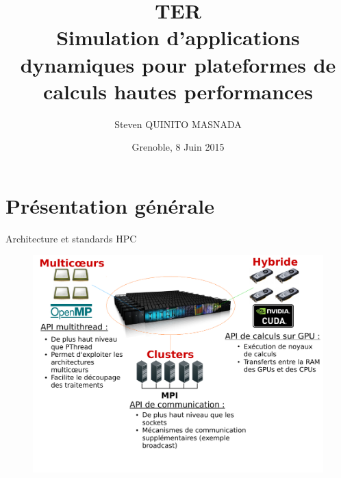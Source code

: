 \documentclass[11pt,xcolor=dvipsnames,presentation]{beamer}
\institute{Équipe MESCAL/LIG\\Sous la direction d'A. Legrand}
\author{Steven QUINITO MASNADA}
\date{Grenoble, 8 Juin 2015}
\title{\textbf{TER} \\ Simulation d'applications dynamiques pour plateformes de calculs hautes performances}
\begin{document}
\maketitle

\section{Présentation générale}
\label{sec-1}
\begin{frame}[label=sec-1-1]{Architecture et standards HPC}
\begin{figure}[tbh]
\centering
\vspace{-1.5mm}
\includegraphics[width=\linewidth]{./Slides/Archi.pdf}
\end{figure}
\end{frame}
\end{document}
